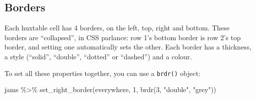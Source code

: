\documentclass[
]{article}
\newenvironment{Shaded}{\begin{snugshade}}{\end{snugshade}}
\newcommand{\DecValTok}[1]{\textcolor[rgb]{0.00,0.00,0.81}{#1}}
\newcommand{\FunctionTok}[1]{\textcolor[rgb]{0.00,0.00,0.00}{#1}}
\newcommand{\NormalTok}[1]{#1}
\newcommand{\SpecialCharTok}[1]{\textcolor[rgb]{0.00,0.00,0.00}{#1}}
\newcommand{\StringTok}[1]{\textcolor[rgb]{0.31,0.60,0.02}{#1}}
\begin{document}
\hypertarget{borders}{%
\subsection{Borders}\label{borders}}

Each huxtable cell has 4 borders, on the left, top, right and bottom.
These borders are ``collapsed'', in CSS parlance: row 1's bottom border
is row 2's top border, and setting one automatically sets the other.
Each border has a thickness, a style (``solid'', ``double'', ``dotted''
or ``dashed'') and a colour.

To set all these properties together, you can use a \texttt{brdr()}
object:

\begin{Shaded}
\begin{Highlighting}[]
\NormalTok{jams }\SpecialCharTok{\%\textgreater{}\%} 
      \FunctionTok{set\_right\_border}\NormalTok{(everywhere, }\DecValTok{1}\NormalTok{, }\FunctionTok{brdr}\NormalTok{(}\DecValTok{3}\NormalTok{, }\StringTok{"double"}\NormalTok{, }\StringTok{"grey"}\NormalTok{))}
\end{Highlighting}
\end{Shaded}

 
  \providecommand{\huxb}[2]{\arrayrulecolor[RGB]{#1}\global\arrayrulewidth=#2pt}
  \providecommand{\huxvb}[2]{\color[RGB]{#1}\vrule width #2pt}
  \providecommand{\huxtpad}[1]{\rule{0pt}{#1}}
  \providecommand{\huxbpad}[1]{\rule[-#1]{0pt}{#1}}
\end{document}

